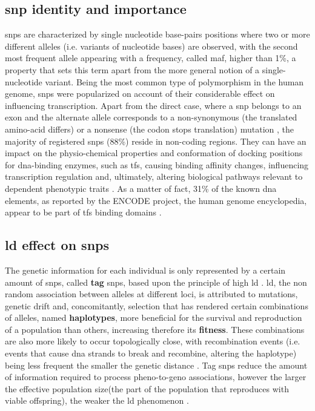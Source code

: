 \subsection{\Acf{snp} identity and importance}
\Acfp{snp} are characterized by single nucleotide base-pairs positions where two or more different alleles (i.e. variants of nucleotide bases) are observed, with the second most frequent allele appearing with a frequency, called \ac{maf}, higher than 1\%, a property that sets this term apart from the more general notion of a single-nucleotide variant. Being the most common type of polymorphism in the human genome, \acp{snp} were popularized on account of their considerable effect on influencing transcription. Apart from the direct case, where a \ac{snp} belongs to an exon and the alternate allele corresponds to a non-synonymous (the translated amino-acid differs) or a nonsense (the codon stops translation) mutation \cite{Ramensky2002}, the majority of registered \acp{snp} (88\%) reside in non-coding regions. They can have an impact on the physio-chemical properties and conformation of docking positions for \ac{dna}-binding enzymes, such as \acp{tf}, causing binding affinity changes, influencing transcription regulation and, ultimately, altering biological pathways relevant to dependent phenotypic traits \cite{Nishizaki2020}. As a matter of fact, 31\% of the known \ac{dna} elements, as reported by the ENCODE project, the human genome encyclopedia, appear to be part of \acp{tf} binding domains \cite{Dunham2012}. 

\subsection{\Acf{ld} effect on \acp{snp}}
The genetic information for each individual is only represented by a certain amount of \acfp{snp}, called \textbf{tag} \acp{snp}, based upon the principle of high \acf{ld} \cite{Visscher2012, Belmont2003}. \ac{ld}, the non random association between alleles at different loci, is attributed to mutations, genetic drift and, concomitantly, selection \cite{Visscher2012} that has rendered certain combinations of alleles, named \textbf{haplotypes}, more beneficial for the survival and reproduction of a population than others, increasing therefore its \textbf{fitness}. These combinations are also more likely to occur topologically close, with recombination events (i.e. events that cause \ac{dna} strands to break and recombine, altering the haplotype) being less frequent the smaller the genetic distance \cite{Visscher2012}. Tag \acp{snp} reduce the amount of information required to process pheno-to-geno associations, however the larger the effective population size(the part of the population that reproduces with viable offspring), the weaker the \ac{ld} phenomenon \cite{Visscher2012}.

